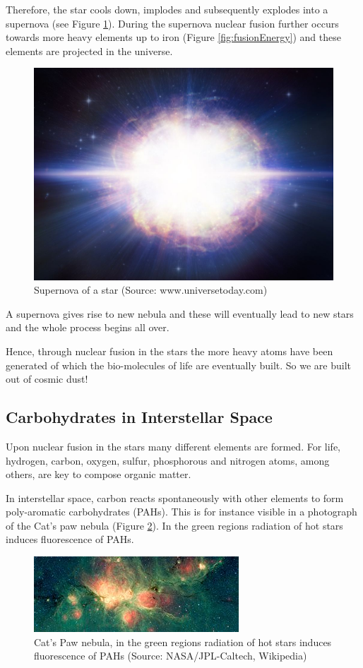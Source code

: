 \documentclass[
  11pt,
]{book}
\begin{document}
Therefore, the star cools down, implodes and subsequently explodes into a supernova (see Figure \ref{fig:supernova}). During the supernova nuclear fusion further occurs towards more heavy elements up to iron (Figure \ref{fig:fusionEnergy}) and these elements are projected in the universe.

\begin{figure}

{\centering \includegraphics[width=0.5\linewidth]{./figs/hires} 

}

\caption{Supernova of a star (Source:  www.universetoday.com)}\label{fig:supernova}
\end{figure}

A supernova gives rise to new nebula and these will eventually lead to new stars and the whole process begins all over.

Hence, through nuclear fusion in the stars the more heavy atoms have been generated of which the bio-molecules of life are eventually built. So we are built out of cosmic dust!

\newpage

\hypertarget{carbohydrates-in-interstellar-space}{%
\subsection{Carbohydrates in Interstellar Space}\label{carbohydrates-in-interstellar-space}}

Upon nuclear fusion in the stars many different elements are formed. For life, hydrogen, carbon, oxygen, sulfur, phosphorous and nitrogen atoms, among others, are key to compose organic matter.

In interstellar space, carbon reacts spontaneously with other elements to form poly-aromatic carbohydrates (PAHs). This is for instance visible in a photograph of the Cat's paw nebula (Figure \ref{fig:catPawNebula}). In the green regions radiation of hot stars induces fluorescence of PAHs.

\begin{figure}

{\centering \includegraphics[width=0.5\linewidth]{./figs/orionWithPAH} 

}

\caption{Cat's Paw nebula, in the green regions radiation of hot stars induces fluorescence of PAHs (Source: NASA/JPL-Caltech, Wikipedia)}\label{fig:catPawNebula}
\end{figure}
\end{document}
